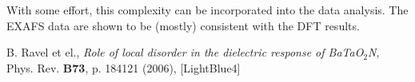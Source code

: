 \begin{frame}
\begin{columns}
\begin{column}{0.5\linewidth}
\begin{center}
      \end{center}
    \end{column}
  \end{columns}
  With some effort, this complexity can be incorporated into the data
  analysis.  The EXAFS data are shown to be (mostly) consistent with
  the DFT results.

  \begin{bottomnote}[0.5][19]
    B. Ravel et el., \textit{Role of local disorder in the dielectric
      response of BaTaO$_2$N}, Phys. Rev. \textbf{B73}, p. 184121 (2006),
    [LightBlue4]
  \end{bottomnote}
\end{frame}

